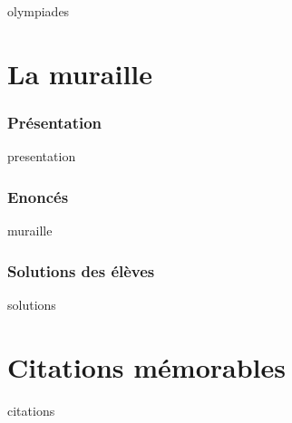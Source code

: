 \documentclass[12pt,A4]{book}
\theoremstyle{definition}
\theoremstyle{thm}
\theoremstyle{def}
\newcounter{sol}[subsection]
\begin{document}
{olympiades}





\chapter{La muraille}
\minitoc \bigskip



\subsection{Présentation}

{presentation}

\subsection{Enoncés}

{muraille}

\subsection{Solutions des élèves}

{solutions}




\chapter{Citations mémorables}

{citations}
\end{document}
